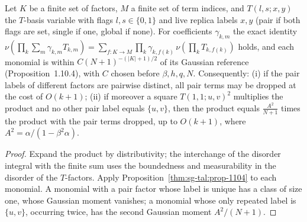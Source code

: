 \begin{theorem}
\label{thm:sg-tal:live-T-expansion}
\leanok
{}
Let $K$ be a finite set of factors, $M$ a finite set of term indices, and $T(l,s;x,y)$ the
$T$-basis variable with flags $l,s\in\{0,1\}$ and live replica labels $x,y$ (pair if both flags
are set, single if one, global if none). For coefficients $\gamma_{k,m}$ the exact identity
$\nu(\prod_k\sum_m\gamma_{k,m}T_{k,m})=\sum_{f:K\to M}\prod_k\gamma_{k,f(k)}\,\nu(\prod_kT_{k,f(k)})$
holds, and each monomial is within $C(N+1)^{-(|K|+1)/2}$ of its Gaussian reference
(Proposition~1.10.4), with $C$ chosen before $\beta,h,q,N$. Consequently:
(i) if the pair labels of different factors are pairwise distinct, all pair terms may be
dropped at the cost of $O(k+1)$; (ii) if moreover a square $T(1,1;u,v)^2$ multiplies the product
and no other pair label equals $\{u,v\}$, then the product equals $\frac{A^2}{N+1}$ times
the product with the pair terms dropped, up to $O(k+1)$, where $A^2=\alpha/(1-\beta^2\alpha)$.
\end{theorem}
\begin{proof}
\leanok
Expand the product by distributivity; the interchange of the disorder integral with the finite
sum uses the boundedness and measurability in the disorder of the $T$-factors. Apply
Proposition~\ref{thm:sg-tal:prop-1104} to each monomial. A monomial with a pair factor whose label is
unique has a class of size one, whose Gaussian moment vanishes; a monomial whose only repeated
label is $\{u,v\}$, occurring twice, has the second Gaussian moment $A^2/(N+1)$.
\end{proof}


